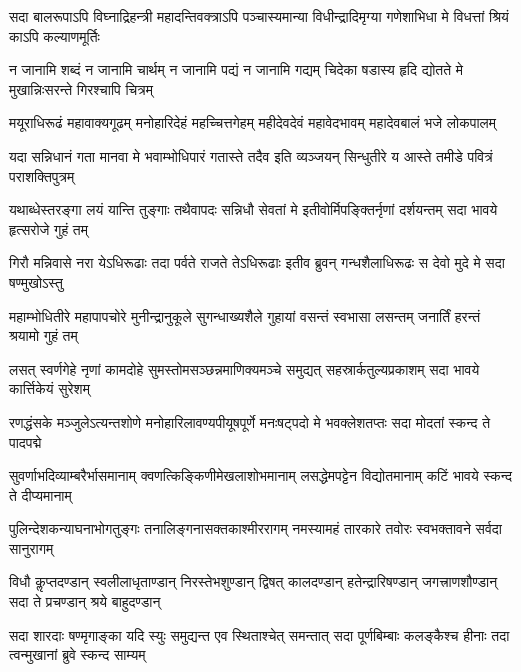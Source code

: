 \documentclass[a5paper,twoside,12pt]{book}
\begin{document}
\Large\setmainfont[Script=Devanagari,Mapping=tex-text]{Sanskrit 2003}
\begin{center}

\newpage
{}
\fourlineindentedshloka
{सदा बालरूपाऽपि विघ्नाद्रिहन्त्री}
{महादन्तिवक्त्राऽपि पञ्चास्यमान्या}
{विधीन्द्रादिमृग्या गणेशाभिधा मे}
{विधत्तां श्रियं काऽपि कल्याणमूर्तिः}

\fourlineindentedshloka
{न जानामि शब्दं न जानामि चार्थम्}
{न जानामि पद्यं न जानामि गद्यम्}
{चिदेका षडास्य हृदि द्योतते मे}
{मुखान्निःसरन्ते गिरश्चापि चित्रम्}

\fourlineindentedshloka
{मयूराधिरूढं महावाक्यगूढम्}
{मनोहारिदेहं महच्चित्तगेहम्}
{महीदेवदेवं महावेदभावम्}
{महादेवबालं भजे लोकपालम्}

\fourlineindentedshloka
{यदा सन्निधानं गता मानवा मे}
{भवाम्भोधिपारं गतास्ते तदैव}
{इति व्यञ्जयन् सिन्धुतीरे य आस्ते}
{तमीडे पवित्रं पराशक्तिपुत्रम्}

\fourlineindentedshloka
{यथाब्धेस्तरङ्गा लयं यान्ति तुङ्गाः}
{तथैवापदः सन्निधौ सेवतां मे}
{इतीवोर्मिपङ्क्तिर्नृणां दर्शयन्तम्}
{सदा भावये हृत्सरोजे गुहं तम्}

\fourlineindentedshloka
{गिरौ मन्निवासे नरा येऽधिरूढाः}
{तदा पर्वते राजते तेऽधिरूढाः}
{इतीव ब्रुवन् गन्धशैलाधिरूढः}
{स देवो मुदे मे सदा षण्मुखोऽस्तु}

\fourlineindentedshloka
{महाम्भोधितीरे महापापचोरे}
{मुनीन्द्रानुकूले सुगन्धाख्यशैले}
{गुहायां वसन्तं स्वभासा लसन्तम्}
{जनार्तिं हरन्तं श्रयामो गुहं तम्}

\fourlineindentedshloka
{लसत् स्वर्णगेहे नृणां कामदोहे}
{सुमस्तोमसञ्छन्नमाणिक्यमञ्चे}
{समुद्यत् सहस्रार्कतुल्यप्रकाशम्}
{सदा भावये कार्त्तिकेयं सुरेशम्}

\fourlineindentedshloka
{रणद्धंसके मञ्जुलेऽत्यन्तशोणे}
{मनोहारिलावण्यपीयूषपूर्णे}
{मनःषट्पदो मे भवक्लेशतप्तः}
{सदा मोदतां स्कन्द ते पादपद्मे}

\fourlineindentedshloka
{सुवर्णाभदिव्याम्बरैर्भासमानाम्}
{क्वणत्किङ्किणीमेखलाशोभमानाम्}
{लसद्धेमपट्टेन विद्योतमानाम्}
{कटिं भावये स्कन्द ते दीप्यमानाम्}

\fourlineindentedshloka
{पुलिन्देशकन्याघनाभोगतुङ्गः}
{तनालिङ्गनासक्तकाश्मीररागम्}
{नमस्यामहं तारकारे तवोरः}
{स्वभक्तावने सर्वदा सानुरागम्}

\fourlineindentedshloka
{विधौ कॢप्तदण्डान् स्वलीलाधृताण्डान्}
{निरस्तेभशुण्डान् द्विषत् कालदण्डान्}
{हतेन्द्रारिषण्डान् जगत्त्राणशौण्डान्}
{सदा ते प्रचण्डान् श्रये बाहुदण्डान्}

\fourlineindentedshloka
{सदा शारदाः षण्मृगाङ्का यदि स्युः}
{समुद्यन्त एव स्थिताश्चेत् समन्तात्}
{सदा पूर्णबिम्बाः कलङ्कैश्च हीनाः}
{तदा त्वन्मुखानां ब्रुवे स्कन्द साम्यम्}


\end{center}
\end{document}
